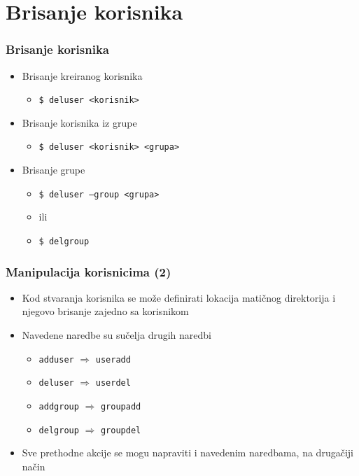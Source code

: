 \documentclass[table,usenames,dvipsnames] {beamer}
\newcommand{\shell}[1]{\texttt{#1}}
\begin{document}
\section{Brisanje korisnika}
\begin{frame}[t]
\frametitle{Brisanje korisnika}
\begin{itemize}
  \item Brisanje kreiranog korisnika
  \begin{itemize}
    \item[] \shell{\$ deluser <korisnik>}
  \end{itemize}
  \item Brisanje korisnika iz grupe
  \begin{itemize}
    \item[] \shell{\$ deluser <korisnik> <grupa>}
  \end{itemize}
  \item Brisanje grupe
  \begin{itemize}
    \item[] \shell{\$ deluser --group <grupa>}
    \item[] ili
    \item[] \shell{\$ delgroup}
  \end{itemize}
\end{itemize}
\end{frame}

\begin{frame}[t]
\frametitle{Manipulacija korisnicima (2)}
\begin{itemize}
  \item Kod stvaranja korisnika se može definirati lokacija matičnog 
        direktorija i njegovo brisanje zajedno sa korisnikom
  \item Navedene naredbe su sučelja drugih naredbi
  \begin{itemize}
    \item[] \shell{adduser} $\Rightarrow$ \shell{useradd}
    \item[] \shell{deluser} $\Rightarrow$ \shell{userdel}
    \item[] \shell{addgroup} $\Rightarrow$ \shell{groupadd}
    \item[] \shell{delgroup} $\Rightarrow$ \shell{groupdel}
  \end{itemize}
  \item Sve prethodne akcije se mogu napraviti i navedenim naredbama, na 
        drugačiji način
\end{itemize}
\end{frame}
\end{document}
